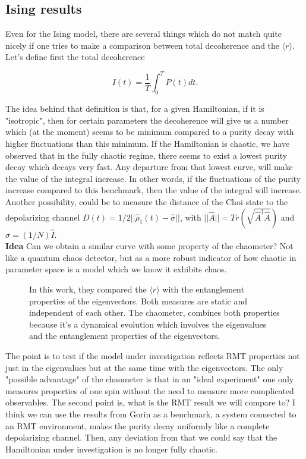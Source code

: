 \subsection{Ising results}

Even for the Ising model, there are several things which do not match quite nicely if one tries to make a comparison between total decoherence and the $\langle r\rangle$. Let's define first the total decoherence

\begin{equation}
    I(t) = \dfrac{1}{T}\int_{0}^{T}P(t)dt .
    \label{eq:decoherence}
\end{equation}

The idea behind that definition is that, for a given Hamiltonian, if it is "isotropic", then for certain parameters the decoherence will give us a number which (at the moment) seems to be minimum compared to a purity decay with higher fluctuations than this minimum. If the Hamiltonian is chaotic, we have observed that in the fully chaotic regime, there seems to exist a lowest purity decay which decays very fast. Any departure from that lowest curve, will make the value of the integral increase. In other words, if the fluctuations of the purity increase compared to this benchmark, then the value of the integral will increase. Another possibility, could be to measure the distance of the Choi state to the depolarizing channel $D(t) = 1/2 ||\hat{\rho}_{1}(t)-\hat{\sigma}||$, with $||\hat{A}||=Tr(\sqrt{{\hat{A}^\dagger}\hat{A}})$ and $\hat{\sigma}=(1/N)\hat{I}$.\\

\textbf{Idea} Can we obtain a similar curve\cite{microcanonical2024} with some property of the chaometer? Not like a quantum chaos detector, but as a more robust indicator of how chaotic in parameter space is a model which we know it exhibits chaos.

\begin{figure}
    \centering
    \caption{In this work, they compared the $\langle r \rangle$ with the entanglement properties of the eigenvectors. Both measures are static and independent of each other. The chaometer, combines both properties because it's a dynamical evolution which involves the eigenvalues and the entanglement properties of the eigenvectors.}
    \label{fig:placeholder}
\end{figure}

The point is to test if the model under investigation reflects RMT properties not just in the eigenvalues but at the same time with the eigenvectors. The only "possible advantage" of the chaometer is that in an "ideal experiment" one only measures properties of one spin without the need to measure more complicated observables. The second point is, what is the RMT result we will compare to? I think we can use the results from Gorin \cite{gorin_2006_dynamics, Gorinpurity2002} as a benchmark, a system connected to an RMT environment, makes the purity decay uniformly like a complete depolarizing channel. Then, any deviation from that we could say that the Hamiltonian under investigation is no longer fully chaotic.